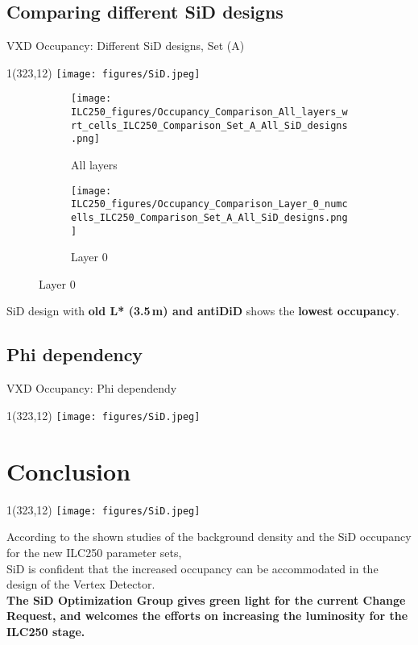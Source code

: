\documentclass[xcolor={dvipsnames}]{beamer}
\newcommand{\sidlogo}{
  \setlength{\TPHorizModule}{1pt}
  \setlength{\TPVertModule}{1pt}
  \begin{textblock}{1}(323,12)
   \texttt{[image: figures/SiD.jpeg]}
  \end{textblock}
  }
\begin{document}
\subsection{Comparing different SiD designs}
\begin{frame}{VXD Occupancy: Different SiD designs, Set (A)}
\sidlogo
\begin{figure}
\centering
\begin{subfigure}[t]{0.48\textwidth}
\centering
\texttt{[image: ILC250\_figures/Occupancy\_Comparison\_All\_layers\_wrt\_cells\_ILC250\_Comparison\_Set\_A\_All\_SiD\_designs.png]}
\caption{\alert{All layers}}
 \end{subfigure}
\hspace*{0.2cm}
\begin{subfigure}[t]{0.48\textwidth}
\centering
\texttt{[image: ILC250\_figures/Occupancy\_Comparison\_Layer\_0\_numcells\_ILC250\_Comparison\_Set\_A\_All\_SiD\_designs.png]}
\caption{\alert{Layer 0}}
\end{subfigure}
\end{figure}
\normalsize SiD design with \textbf{old L* (3.5\,m) and antiDiD} shows the \textbf{lowest occupancy}.
\end{frame}

\subsection{Phi dependency}
\begin{frame}{VXD Occupancy: Phi dependendy}
\sidlogo

\end{frame}

\section{Conclusion}
\begin{frame}
\sidlogo
 According to the shown studies of the background density and the SiD occupancy for the new ILC250 parameter sets,\\
 \alert{SiD is confident that the increased occupancy can be accommodated in the design of the Vertex Detector.}\\
 \textbf{The SiD Optimization Group gives green light for the current Change Request, and welcomes the efforts on increasing the luminosity for the ILC250 stage.}
\end{frame}


\end{document}
